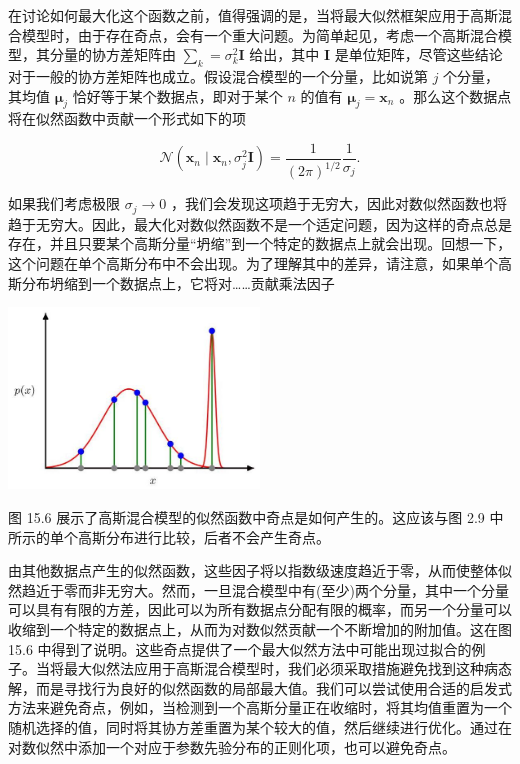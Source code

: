 \documentclass[10pt]{article}
\begin{document}
在讨论如何最大化这个函数之前，值得强调的是，当将最大似然框架应用于高斯混合模型时，由于存在奇点，会有一个重大问题。为简单起见，考虑一个高斯混合模型，其分量的协方差矩阵由 \({\mathbf{\sum }}_{k} = {\sigma }_{k}^{2}\mathbf{I}\) 给出，其中 \(\mathbf{I}\) 是单位矩阵，尽管这些结论对于一般的协方差矩阵也成立。假设混合模型的一个分量，比如说第 \(j\) 个分量，其均值 \({\mathbf{\mu }}_{j}\) 恰好等于某个数据点，即对于某个 \(n\) 的值有 \({\mathbf{\mu }}_{j} = {\mathbf{x}}_{n}\) 。那么这个数据点将在似然函数中贡献一个形式如下的项

\[
\mathcal{N}\left( {{\mathbf{x}}_{n} \mid  {\mathbf{x}}_{n},{\sigma }_{j}^{2}\mathbf{I}}\right)  = \frac{1}{{\left( 2\pi \right) }^{1/2}}\frac{1}{{\sigma }_{j}}. \tag{15.14}
\]

如果我们考虑极限 \({\sigma }_{j} \rightarrow  0\) ，我们会发现这项趋于无穷大，因此对数似然函数也将趋于无穷大。因此，最大化对数似然函数不是一个适定问题，因为这样的奇点总是存在，并且只要某个高斯分量“坍缩”到一个特定的数据点上就会出现。回想一下，这个问题在单个高斯分布中不会出现。为了理解其中的差异，请注意，如果单个高斯分布坍缩到一个数据点上，它将对……贡献乘法因子

\begin{center}
\includegraphics[max width=0.5\textwidth]{images/0194e279-9b28-703a-88f4-c3ac21e2010d_489_899_344_618_447_0.jpg}
\end{center}
\hspace*{3em} 

图 15.6 展示了高斯混合模型的似然函数中奇点是如何产生的。这应该与图 2.9 中所示的单个高斯分布进行比较，后者不会产生奇点。

由其他数据点产生的似然函数，这些因子将以指数级速度趋近于零，从而使整体似然趋近于零而非无穷大。然而，一旦混合模型中有(至少)两个分量，其中一个分量可以具有有限的方差，因此可以为所有数据点分配有限的概率，而另一个分量可以收缩到一个特定的数据点上，从而为对数似然贡献一个不断增加的附加值。这在图 15.6 中得到了说明。这些奇点提供了一个最大似然方法中可能出现过拟合的例子。当将最大似然法应用于高斯混合模型时，我们必须采取措施避免找到这种病态解，而是寻找行为良好的似然函数的局部最大值。我们可以尝试使用合适的启发式方法来避免奇点，例如，当检测到一个高斯分量正在收缩时，将其均值重置为一个随机选择的值，同时将其协方差重置为某个较大的值，然后继续进行优化。通过在对数似然中添加一个对应于参数先验分布的正则化项，也可以避免奇点。
\end{document}
